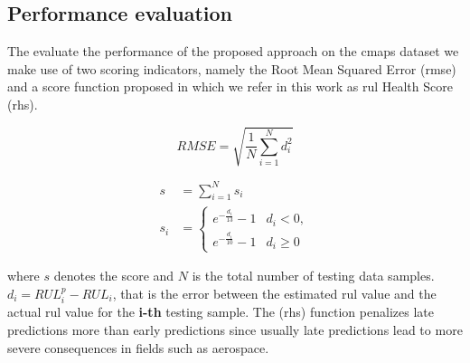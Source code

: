 \subsection{Performance evaluation}
\label{sec:rul_metrics}

The evaluate the performance of the proposed approach on the \gls{cmaps} dataset we make use of two scoring indicators, namely the Root Mean Squared Error (\gls{rmse}) and a score function proposed in \cite{Saxena2008} which we refer in this work as \gls{rul} Health Score (\gls{rhs}). 

\begin{equation}
RMSE = \sqrt{ \frac{1}{N} \sum_{i=1}^{N}{d_i^2}}
\end{equation}

\begin{align}
s &= \sum_{i=1}^{N}{s_i}\\
s_i &= \begin{cases} 
      e^{-\frac{d_i}{13}} - 1 & d_i < 0, \\
      e^{-\frac{d_i}{10}} - 1 & d_i \geq 0
\end{cases}
\end{align}

where $s$ denotes the score and $N$ is the total number of testing data samples. $d_i = RUL_i^p - RUL_i$, that is the error between the estimated \gls{rul} value and the actual \gls{rul} value for the \textbf{i-th} testing sample. The (\gls{rhs}) function penalizes late predictions more than early predictions since usually late predictions lead to more severe consequences in fields such as aerospace.

